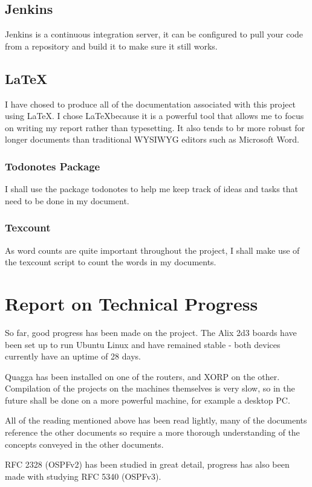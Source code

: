 \documentclass[12pt]{report}
\begin{document}
\section{Jenkins}
Jenkins is a continuous integration server, it can be configured to pull your
code from a repository and build it to make sure it still works.  

\section{\LaTeX}
I have chosed to produce all of the documentation associated with this project
using \LaTeX. I chose \LaTeX because it is a powerful tool that allows me to
focus on writing my report rather than typesetting. It also tends to br more
robust for longer documents than traditional WYSIWYG editors such as Microsoft
Word.

\subsection{Todonotes Package}
I shall use the package todonotes to help me keep track of ideas and tasks that
need to be done in my document.

\subsection{Texcount}
As word counts are quite important throughout the project, I shall make use of
the texcount script to count the words in my documents.


\chapter{Report on Technical Progress}
So far, good progress has been made on the project.  The Alix 2d3 boards have
been set up to run Ubuntu Linux and have remained stable - both devices
currently have an uptime of 28 days.

Quagga has been installed on one of the routers, and XORP on the other.
Compilation of the projects on the machines themselves is very slow, so in the
future shall be done on a more powerful machine, for example a desktop PC.

All of the reading mentioned above has been read lightly, many of the documents
reference the other documents so require a more thorough understanding of the
concepts conveyed in the other documents.

RFC 2328 (OSPFv2) has been studied in great detail, progress has also been made
with studying RFC 5340 (OSPFv3). 
\end{document}

